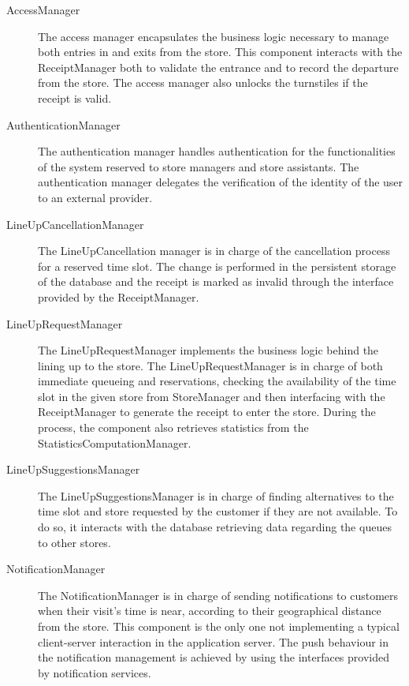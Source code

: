 \documentclass[../../main.tex]{subfiles}
\begin{document}
\begin{description}
    
    \item[AccessManager] The access manager encapsulates the business logic necessary to manage both entries in and exits from the store. 
    This component interacts with the ReceiptManager both to validate the entrance and to record the departure from the store. 
    The access manager also unlocks the turnstiles if the receipt is valid. 

    \item[AuthenticationManager] The authentication manager handles authentication for the functionalities of the 
    system reserved to store managers and store assistants. The authentication manager delegates the verification of the 
    identity of the user to an external provider.

    \item[LineUpCancellationManager] The LineUpCancellation manager is in charge of the cancellation process for 
    a reserved time slot. The change is performed in the persistent storage of the database and the receipt is marked as 
    invalid through the interface provided by the ReceiptManager.
    
    \item[LineUpRequestManager] The LineUpRequestManager implements the business logic behind the lining up to the store. 
    The LineUpRequestManager is in charge of both immediate queueing and reservations, 
    checking the availability of the time slot in the given store from StoreManager and then interfacing with the 
    ReceiptManager to generate the receipt to enter the store. During the process, the component also retrieves 
    statistics from the StatisticsComputationManager.

    \item[LineUpSuggestionsManager] The LineUpSuggestionsManager is in charge of finding alternatives to the time slot and 
    store requested by the customer if they are not available. To do so, it interacts with the database retrieving data 
    regarding the queues to other stores.

    \item[NotificationManager] The NotificationManager is in charge of sending notifications to customers when their visit's time is near, 
    according to their geographical distance from the store. This component is the only one not implementing a typical 
    client-server interaction in the application server. The push behaviour in the notification management is 
    achieved by using the interfaces provided by notification services.


\end{description}
\end{document}
